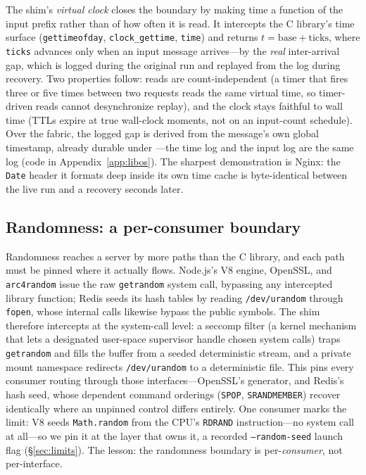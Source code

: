 The shim's \emph{virtual clock} closes the boundary by making time a
function of the input prefix rather than of how often it is read. It
intercepts the C library's time surface (\texttt{gettimeofday},
\texttt{clock\_gettime}, \texttt{time}) and returns
$t=\mathrm{base}+\mathrm{ticks}$, where \texttt{ticks} advances only when
an input message arrives---by the \emph{real} inter-arrival gap, which is
logged during the original run and replayed from the log during recovery.
Two properties follow: reads are count-independent (a timer that fires
three or five times between two requests reads the same virtual time, so
timer-driven reads cannot desynchronize replay), and the clock stays
faithful to wall time (TTLs expire at true wall-clock moments, not on an
input-count schedule). Over the fabric, the logged gap is derived from the
message's own global timestamp, already durable under \Durability---the
time log and the input log are the same log (code in
Appendix~\ref{app:libos}). The sharpest demonstration is Nginx: the
\texttt{Date} header it formats deep inside its own time cache is
byte-identical between the live run and a recovery seconds later.

\subsection{Randomness: a per-consumer boundary}
\label{sec:rng}

Randomness reaches a server by more paths than the C library, and each path
must be pinned where it actually flows. Node.js's V8 engine, OpenSSL, and
\texttt{arc4random} issue the raw \texttt{getrandom} system call,
bypassing any intercepted library function; Redis seeds its hash tables by
reading \texttt{/dev/urandom} through \texttt{fopen}, whose internal calls
likewise bypass the public symbols. The shim therefore intercepts at the
system-call level: a seccomp filter (a kernel mechanism that lets a
designated user-space supervisor handle chosen system calls) traps
\texttt{getrandom} and fills the buffer from a seeded deterministic
stream, and a private mount namespace redirects \texttt{/dev/urandom} to a
deterministic file. This pins every consumer routing through those
interfaces---OpenSSL's generator, and Redis's hash seed, whose dependent
command orderings (\texttt{SPOP}, \texttt{SRANDMEMBER}) recover
identically where an unpinned control differs entirely. One consumer marks
the limit: V8 seeds \texttt{Math.random} from the CPU's \texttt{RDRAND}
instruction---no system call at all---so we pin it at the layer that owns
it, a recorded \texttt{--random-seed} launch flag (\S\ref{sec:limits}).
The lesson: the randomness boundary is per-\emph{consumer}, not
per-interface.

